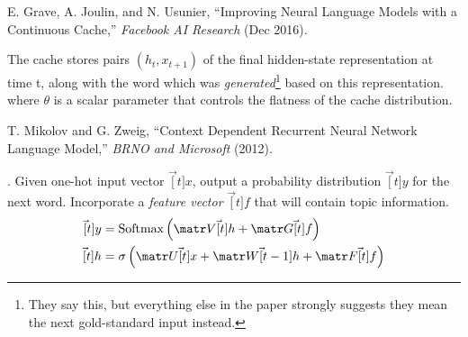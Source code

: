 \documentclass[11pt]{article}
\begin{document}
\vspace{-1em}
{\footnotesize E. Grave, A. Joulin, and N. Usunier, ``Improving Neural Language Models with a Continuous Cache,'' \textit{Facebook AI Research} (Dec 2016).}

The cache stores pairs $(h_t, x_{t+1})$ of the final hidden-state representation at time t, along with the word which was \textit{generated}\footnote{They say this, but everything else in the paper strongly suggests they mean the next gold-standard input instead.} based on this representation. 
where $\theta$ is a scalar parameter that controls the flatness of the cache distribution. 





\vspace{-1em}
{\footnotesize T. Mikolov and G. Zweig, ``Context Dependent Recurrent Neural Network Language Model,'' \textit{BRNO and Microsoft} (2012).}

. Given one-hot input vector $\vec[t]{x}$, output a probability distribution $\vec[t]{y}$ for the next word. Incorporate a \textit{feature vector} $\vec[t]{f}$ that will contain topic information.
\begin{align}
\vec[t]{y}
&= \text{Softmax}\left( \matr V \vec[t]{h} + \matr G \vec[t]{f} \right) \\
\vec[t]{h}
&= \sigma\left( \matr U \vec[t]{x} + \matr W \vec[t-1]{h} + \matr F \vec[t]{f}  \right)
\end{align}
\end{document}
